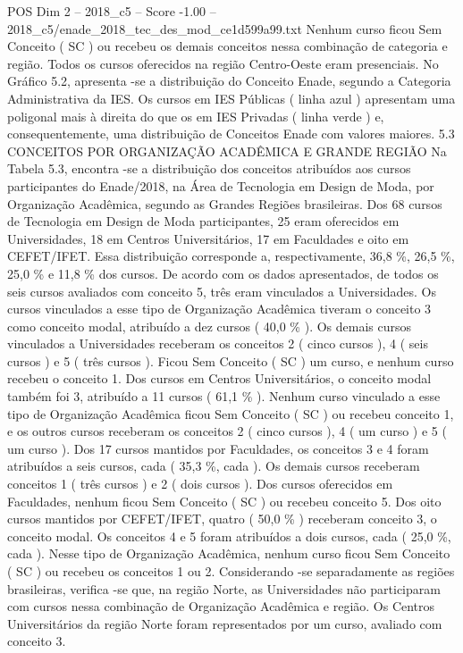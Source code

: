 \begin{textsample}{POS Dim 2 – 2018\_c5 – Score -1.00 – 2018\_c5/enade\_2018\_tec\_des\_mod\_ce1d599a99.txt}
Nenhum curso ficou Sem Conceito ( SC ) ou recebeu os demais conceitos nessa combinação de categoria e região.
Todos os cursos oferecidos na região Centro-Oeste eram presenciais.
No Gráfico 5.2, apresenta -se a distribuição do Conceito Enade, segundo a Categoria Administrativa da IES.
Os cursos em IES Públicas ( linha azul ) apresentam uma poligonal mais à direita do que os em IES Privadas ( linha verde ) e, consequentemente, uma distribuição de Conceitos Enade com valores maiores. 5.3 CONCEITOS POR ORGANIZAÇÃO ACADÊMICA E GRANDE REGIÃO Na Tabela 5.3, encontra -se a distribuição dos conceitos atribuídos aos cursos participantes do Enade/2018, na Área de Tecnologia em Design de Moda, por Organização Acadêmica, segundo as Grandes Regiões brasileiras.
Dos 68 cursos de Tecnologia em Design de Moda participantes, 25 eram oferecidos em Universidades, 18 em Centros Universitários, 17 em Faculdades e oito em CEFET/IFET.
Essa distribuição corresponde a, respectivamente, 36,8 \%, 26,5 \%, 25,0 \% e 11,8 \% dos cursos.
De acordo com os dados apresentados, de todos os seis cursos avaliados com conceito 5, três eram vinculados a Universidades.
Os cursos vinculados a esse tipo de Organização Acadêmica tiveram o conceito 3 como conceito modal, atribuído a dez cursos ( 40,0 \% ).
Os demais cursos vinculados a Universidades receberam os conceitos 2 ( cinco cursos ), 4 ( seis cursos ) e 5 ( três cursos ).
Ficou Sem Conceito ( SC ) um curso, e nenhum curso recebeu o conceito 1.
Dos cursos em Centros Universitários, o conceito modal também foi 3, atribuído a 11 cursos ( 61,1 \% ).
Nenhum curso vinculado a esse tipo de Organização Acadêmica ficou Sem Conceito ( SC ) ou recebeu conceito 1, e os outros cursos receberam os conceitos 2 ( cinco cursos ), 4 ( um curso ) e 5 ( um curso ).
Dos 17 cursos mantidos por Faculdades, os conceitos 3 e 4 foram atribuídos a seis cursos, cada ( 35,3 \%, cada ).
Os demais cursos receberam conceitos 1 ( três cursos ) e 2 ( dois cursos ).
Dos cursos oferecidos em Faculdades, nenhum ficou Sem Conceito ( SC ) ou recebeu conceito 5.
Dos oito cursos mantidos por CEFET/IFET, quatro ( 50,0 \% ) receberam conceito 3, o conceito modal.
Os conceitos 4 e 5 foram atribuídos a dois cursos, cada ( 25,0 \%, cada ).
Nesse tipo de Organização Acadêmica, nenhum curso ficou Sem Conceito ( SC ) ou recebeu os conceitos 1 ou 2.
Considerando -se separadamente as regiões brasileiras, verifica -se que, na região Norte, as Universidades não participaram com cursos nessa combinação de Organização Acadêmica e região.
Os Centros Universitários da região Norte foram representados por um curso, avaliado com conceito 3.

\end{textsample}
